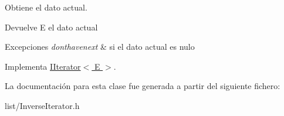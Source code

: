 Obtiene el dato actual. 

\begin{DoxyReturn}{Devuelve}
E el dato actual 
\end{DoxyReturn}

\begin{DoxyExceptions}{Excepciones}
{\em donthavenext} & si el dato actual es nulo \\
\hline
\end{DoxyExceptions}


Implementa \hyperlink{classIIterator_a8a73f0fb41a66fe98e5e636378759196}{I\-Iterator$<$ E $>$}.



La documentación para esta clase fue generada a partir del siguiente fichero\-:\begin{DoxyCompactItemize}
\item 
list/Inverse\-Iterator.\-h\end{DoxyCompactItemize}
